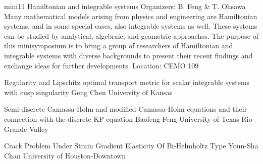 \mini
{mini11}
{Hamiltonian and integrable systems}
{Organizers: B. Feng \& T. Ohsawa}
{Many mathematical models arising from physics and engineering are Hamiltonian systems, and in some special cases, also integrable systems as well. These systems can be studied by analytical, algebraic, and geometric approaches. The purpose of this minisymposium is to bring a group of researchers of Hamiltonian and integrable systems with diverse backgrounds to present their recent findings and exchange ideas for further developments.}
{Location: CEMO 109}

\begin{talks}
\item\talk
{Regularity and Lipschitz optimal transport metric for scalar integrable systems with cusp singularity}
{Geng Chen}
{University of Kansas}
\item\talk
{Semi-discrete Camassa-Holm and modified Camassa-Holm equations and their connection with the discrete KP equation}
{Baofeng Feng}
{University of Texas Rio Grande Valley}
\item\talk
{Crack Problem Under Strain Gradient Elasticity Of Bi-Helmholtz Type}
{Youn-Sha Chan}
{University of Houston-Downtown}
\end{talks}
\room
